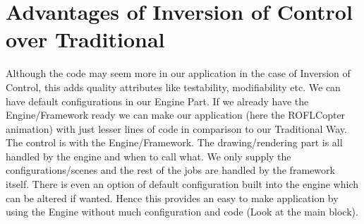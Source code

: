 \documentclass{article}
\begin{document}
\section{Advantages of Inversion of Control over Traditional}
Although the code may seem more in our application in the case of Inversion of
Control, this adds quality attributes like testability, modifiability etc. We
can have default configurations in our Engine Part. If we already have the
Engine/Framework ready we can make our application (here the ROFLCopter
animation) with just lesser lines of code in comparison to our Traditional Way.
The control is with the Engine/Framework. The drawing/rendering part is all
handled by the engine and when to call what. We only supply the
configurations/scenes and the rest of the jobs are handled by the framework
itself. There is even an option of default configuration built into the engine
which can be altered if wanted. Hence this provides an easy to make application
by using the Engine without much configuration and code (Look at the main
block). 
\end{document}

